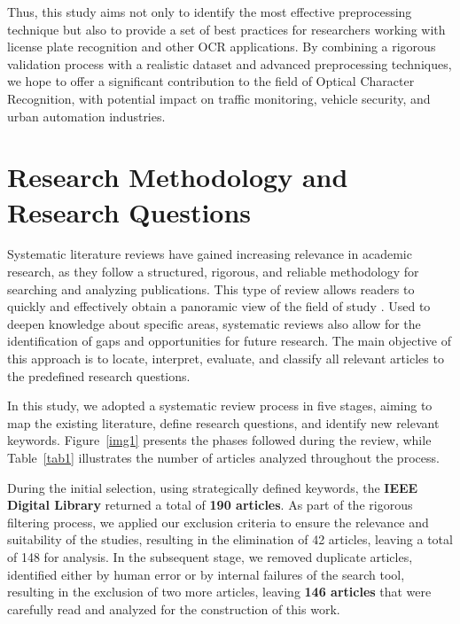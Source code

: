 \documentclass[conference]{IEEEtran}
\begin{document}
	Thus, this study aims not only to identify the most effective preprocessing technique but also to provide a set of best practices for researchers working with license plate recognition and other OCR applications. By combining a rigorous validation process with a realistic dataset and advanced preprocessing techniques, we hope to offer a significant contribution to the field of Optical Character Recognition, with potential impact on traffic monitoring, vehicle security, and urban automation industries.
	
	\section{Research Methodology and Research Questions}
	Systematic literature reviews have gained increasing relevance in academic research, as they follow a structured, rigorous, and reliable methodology for searching and analyzing publications. This type of review allows readers to quickly and effectively obtain a panoramic view of the field of study \cite{b4}. Used to deepen knowledge about specific areas, systematic reviews also allow for the identification of gaps and opportunities for future research. The main objective of this approach is to locate, interpret, evaluate, and classify all relevant articles to the predefined research questions.
	
	In this study, we adopted a systematic review process in five stages, aiming to map the existing literature, define research questions, and identify new relevant keywords. Figure~\ref{img1} presents the phases followed during the review, while Table~\ref{tab1} illustrates the number of articles analyzed throughout the process.
	
	During the initial selection, using strategically defined keywords, the \textbf{IEEE Digital Library} returned a total of \textbf{190 articles}. As part of the rigorous filtering process, we applied our exclusion criteria to ensure the relevance and suitability of the studies, resulting in the elimination of 42 articles, leaving a total of 148 for analysis. In the subsequent stage, we removed duplicate articles, identified either by human error or by internal failures of the search tool, resulting in the exclusion of two more articles, leaving \textbf{146 articles} that were carefully read and analyzed for the construction of this work.
	
\end{document}
